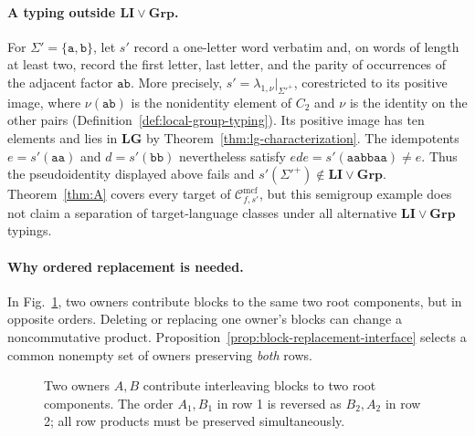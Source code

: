 \documentclass[11pt]{article}
\numberwithin{equation}{section}
\theoremstyle{plain}
\theoremstyle{definition}
\theoremstyle{remark}
\newcommand{\Cmcf}[2]{\mathcal{C}^{\mathrm{mcf}}_{#1,#2}}
\theoremstyle{plain}
\begin{document}
\paragraph{A typing outside $\mathbf{LI}\vee\mathbf{Grp}$.}
For $\Sigma'=\{\mathtt a,\mathtt b\}$, let $s'$ record a
one-letter word verbatim and, on words of length at least two,
record the first letter, last letter, and the parity of occurrences
of the adjacent factor $\mathtt{ab}$.  More precisely,
$s'=\lambda_{1,\nu}|_{\Sigma'^+}$, corestricted to its positive
image, where $\nu(\mathtt{ab})$ is the nonidentity element of
$C_2$ and $\nu$ is the identity on the other pairs
(Definition~\ref{def:local-group-typing}).  Its positive image
has ten elements and lies in $\mathbf{LG}$ by
Theorem~\ref{thm:lg-characterization}.
The idempotents $e=s'(\mathtt{aa})$ and
$d=s'(\mathtt{bb})$ nevertheless satisfy
$ede=s'(\mathtt{aabbaa})\ne e$.
Thus the pseudoidentity displayed above fails and
$s'(\Sigma'^+)\notin\mathbf{LI}\vee\mathbf{Grp}$.
Theorem~\ref{thm:A} covers every target of
$\Cmcf{f}{s'}$, but this semigroup example does not claim
a separation of target-language classes under all alternative
$\mathbf{LI}\vee\mathbf{Grp}$ typings.

\paragraph{Why ordered replacement is needed.}
In Fig.~\ref{fig:interleaved-blocks}, two owners contribute blocks to
the same two root components, but in opposite orders.
Deleting or replacing one owner's blocks can change a noncommutative
product.  Proposition~\ref{prop:block-replacement-interface}
selects a common nonempty set of owners preserving \emph{both} rows.
\begin{figure}[t]
\centering
{}
\caption{Two owners $A,B$ contribute interleaving blocks to two
root components.  The order $A_1,B_1$ in row 1 is reversed as
$B_2,A_2$ in row 2; all row products must be preserved simultaneously.}
\label{fig:interleaved-blocks}
\end{figure}
\end{document}
